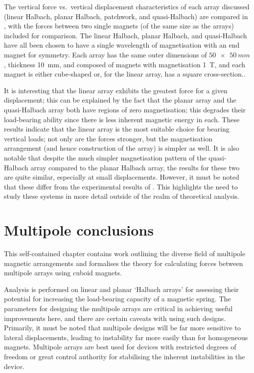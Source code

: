 \documentclass[11pt,a4paper]{memoir}
\begin{document}
The vertical force vs.\ vertical displacement characteristics of each array discussed (linear Halbach, planar Halbach, patchwork, and quasi-Halbach) are compared in , with the forces between two single magnets (of the same size as the arrays) included for comparison.
The linear Halbach, planar Halbach, and quasi-Halbach have all been chosen to have a single wavelength of magnetisation with an end magnet for symmetry.
Each array has the same outer dimensions of $\SI{50x50}{mm}$, thickness \SI{10}{mm}, and composed of magnets with magnetisation \SI{1}{T}, and each magnet is either cube-shaped or, for the linear array, has a square cross-section..

It is interesting that the linear array exhibits the greatest force for a given displacement; this can be explained by the fact that the planar array and the quasi-Halbach array both have regions of zero magnetisation; this degrades their load-bearing ability since there is less inherent magnetic energy in each.
These results indicate that the linear array is the most suitable choice for bearing vertical loads; not only are the forces stronger, but the magnetisation arrangement (and hence construction of the array) is simpler as well.
It is also notable that despite the much simpler magnetisation pattern of the quasi-Halbach array compared to the planar Halbach array, the results for these two are quite similar, especially at small displacements.
However, it must be noted that these differ from the experimental results of \textcite{moser2002-maglev}.
This highlights the need to study these systems in more detail outside of the realm of theoretical analysis.

\begin{figure}
\centering
{}
\end{figure}

\section{Multipole conclusions}

This self-contained chapter contains work outlining the diverse field of multipole magnetic arrangements and formalises the theory for calculating forces between multipole arrays using cuboid magnets.

Analysis is performed on linear and planar `Halbach arrays' for assessing their potential for increasing the load-bearing capacity of a magnetic spring.
The parameters for designing the multipole arrays are critical in achieving useful improvements here, and there are certain caveats with using such designs.
Primarily, it must be noted that multipole designs will be far more sensitive to lateral displacements, leading to instability far more easily than for homogeneous magnets.
Multipole arrays are best used for devices with restricted degrees of freedom or great control authority for stabilising the inherent instabilities in the device.
\end{document}
